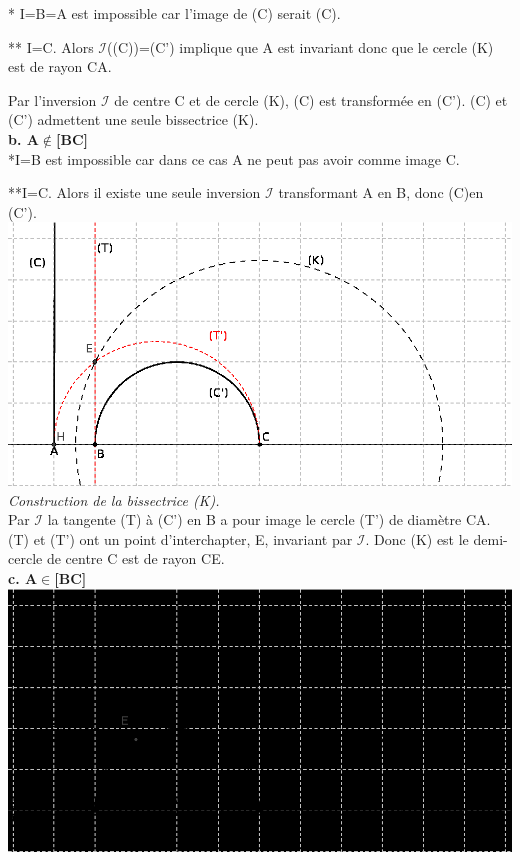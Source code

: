 \documentclass[a4paper, 12pt, twoside]{book}
\begin{document}
* I=B=A est impossible car l'image de (C) serait (C).\

** I=C. Alors $\mathcal{I}$((C))=(C') implique que A est invariant donc que le cercle (K) est de rayon CA.\

Par l'inversion $\mathcal{I}$ de centre C et de cercle (K), (C) est transformée en (C'). (C) et (C') admettent une seule bissectrice (K).\\

\textbf{b. A$\notin$[BC]}\\

*I=B est impossible car dans ce cas A ne peut pas avoir comme image C.\

**I=C. Alors il existe  une seule inversion $\mathcal{I}$ transformant A en B, donc (C)en (C').\\ 

\includegraphics[scale=0.9]{figures/hyper38bis.eps}\\

\textit{Construction de la bissectrice (K).}\\

Par $\mathcal{I}$ la tangente (T) à (C') en B a pour image le cercle (T') de diamètre CA. (T) et (T') ont un point d'interchapter, E, invariant par $\mathcal{I}$. Donc (K) est le demi-cercle de centre C est de rayon CE.\\

 \textbf{c. A$\in $[BC]}\\
 
 \includegraphics[scale=0.9]{figures/hyper38ter.eps}\\
 
\end{document}
